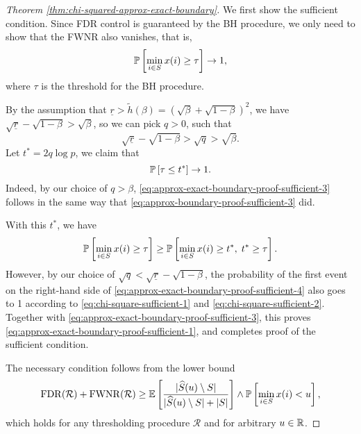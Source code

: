 \begin{proof}[Theorem \ref{thm:chi-squared-approx-exact-boundary}]
We first show the sufficient condition.
Since FDR control is guaranteed by the BH procedure, we only need to show that the FWNR also vanishes, that is,
\begin{equation} \label{eq:approx-exact-boundary-proof-sufficient-1}
    \P\left[\min_{i\in S}x(i) \ge \tau\right] \to 1,
\end{equation}
where $\tau$ is the threshold for the BH procedure.

By the assumption that $\underline{r}>\widetilde{h}(\beta)=(\sqrt{\beta}+\sqrt{1-\beta})^2$, we have $\sqrt{\underline{r}}-\sqrt{1-\beta}>\sqrt{\beta}$, so we can pick $q>0$, such that 
\begin{equation} \label{eq:approx-exact-boundary-proof-sufficient-2}
\sqrt{\underline{r}}-\sqrt{1-\beta}>\sqrt{q}>\sqrt{\beta}.
\end{equation}
Let $t^*=2q\log{p}$, we claim that 
\begin{equation} \label{eq:approx-exact-boundary-proof-sufficient-3}
\P\left[\tau\le t^*\right]\to 1.
\end{equation}
Indeed, by our choice of $q>\beta$, \eqref{eq:approx-exact-boundary-proof-sufficient-3} follows in the same way that \eqref{eq:approx-boundary-proof-sufficient-3} did.

With this $t^*$, we have
\begin{equation} \label{eq:approx-exact-boundary-proof-sufficient-4}
    \P\left[\min_{i\in S}x(i) \ge \tau\right] \ge 
    \P\left[\min_{i\in S}x(i) \ge t^*,\; t^* \ge \tau\right].
\end{equation}
However, by our choice of $\sqrt{q} < \sqrt{\underline{r}}-\sqrt{1-\beta}$, the probability of the first event on the right-hand side of \eqref{eq:approx-exact-boundary-proof-sufficient-4} also goes to 1 according to \eqref{eq:chi-square-sufficient-1} and \eqref{eq:chi-square-sufficient-2}.
Together with \eqref{eq:approx-exact-boundary-proof-sufficient-3}, this proves \eqref{eq:approx-exact-boundary-proof-sufficient-1}, and completes proof of the sufficient condition.

The necessary condition follows from the lower bound
\begin{equation} \label{eq:approx-exact-boundary-proof-necessary-1}
    \mathrm{FDR}(\mathcal{R}) + \mathrm{FWNR}(\mathcal{R}) \ge \E\left[\frac{|\widehat{S}(u)\setminus S|}{|\widehat{S}(u)\setminus S| + |S|}\right] \wedge 
    \P\left[\min_{i\in S}x(i)<u\right],
\end{equation}
which holds for any thresholding procedure $\mathcal{R}$ and for arbitrary $u\in\R$.


\end{proof}
